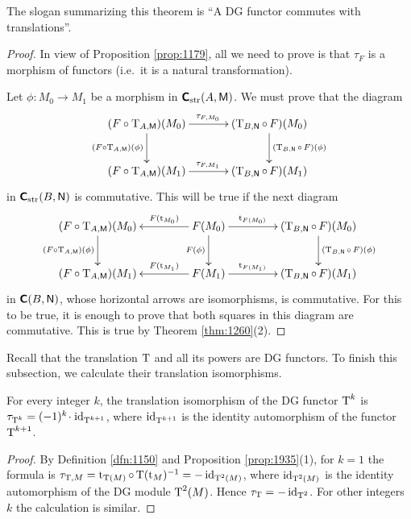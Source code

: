 The slogan summarizing this theorem is ``A DG functor commutes with 
translations''. 

\begin{proof}
In view of Proposition \ref{prop:1179}, all we need to prove is that 
$\tau_{F}$ is a morphism of functors (i.e.\ it is a natural transformation). 

Let $\phi : M_0 \to M_1$ be a morphism in 
$\boldsymbol{\mathsf{C}}_{\mathrm{str}}(A, \operatorname{\mathsf{M}})$. We must prove that the diagram 
\[ \UseTips  \xymatrix @C=8ex @R=6ex {
(F \circ \opn{T}_{A, \cat{M}})(M_0)
\ar[r]^{ \tau_{F, M_0} } 
\ar[d]_{ (F \circ \opn{T}_{A, \cat{M}})(\phi) }
&
(\opn{T}_{B, \cat{N}} \circ \, F)(M_0)
\ar[d]^{ (\opn{T}_{B, \cat{N}} \circ \, F)(\phi) }
\\
(F \circ \opn{T}_{A, \cat{M}})(M_1)
\ar[r]^{ \tau_{F, M_1} } 
&
(\opn{T}_{B, \cat{N}} \circ \, F)(M_1)
} \]
in $\boldsymbol{\mathsf{C}}_{\mathrm{str}}(B, \operatorname{\mathsf{N}})$ is commutative.
This will be true if the next diagram 
\[ \UseTips  \xymatrix @C=10ex @R=6ex {
(F \circ \opn{T}_{A, \cat{M}})(M_0)
\ar[d]_{ (F \circ \opn{T}_{A, \cat{M}})(\phi) }
&
F(M_0)
\ar[l]_(0.4){ F(\opn{t}_{M_0}) }
\ar[r]^(0.4){ \opn{t}_{F(M_0)} }
\ar[d]_{F(\phi)}
&
(\opn{T}_{B, \cat{N}} \circ \, F)(M_0)
\ar[d]^{ (\opn{T}_{B, \cat{N}} \circ \, F)(\phi) }
\\
(F \circ \opn{T}_{A, \cat{M}})(M_1)
&
F(M_1)
\ar[l]_(0.4){ F(\opn{t}_{M_1}) }
\ar[r]^(0.4){ \opn{t}_{F(M_1)} }
&
(\opn{T}_{B, \cat{N}} \circ \, F)(M_1)
} \]
in $\boldsymbol{\mathsf{C}}(B, \operatorname{\mathsf{N}})$, whose horizontal arrows are isomorphisms, is 
commutative. For this to be true, it is enough to prove that both squares in 
this diagram are commutative. This is true by 
Theorem \ref{thm:1260}(2). 
\end{proof}

Recall that the translation $\operatorname{T}$ and all its powers are DG functors. 
To finish this subsection, we calculate their translation isomorphisms. 

\begin{prop} \label{prop:1300}
For every integer $k$, the translation isomorphism of the DG functor 
$\operatorname{T}^k$ is 
$\tau_{\operatorname{T}^k} = (-1)^k \mspace{1.5mu}{\cdot}\mspace{1.5mu} \operatorname{id}_{ \operatorname{T}^{k + 1}}$,
where $\operatorname{id}_{ \operatorname{T}^{k + 1}}$ is the identity automorphism of the 
functor $\operatorname{T}^{k + 1}$. 
\end{prop}

\begin{proof}
By Definition \ref{dfn:1150} and Proposition \ref{prop:1935}(1), for $k = 1$ 
the formula is
$\tau_{ \operatorname{T}, M} = \operatorname{t}_{\operatorname{T}(M)} \circ \operatorname{T}(\operatorname{t}_M)^{-1} = 
- \operatorname{id}_{ \operatorname{T}^2(M)}$,
where $\operatorname{id}_{ \operatorname{T}^2(M)}$ is the identity automorphism of the DG 
module 
$\operatorname{T}^2(M)$. Hence $\tau_{ \operatorname{T}} =  - \operatorname{id}_{\operatorname{T}^2}$.
For other integers $k$ the calculation is similar.
\end{proof}



